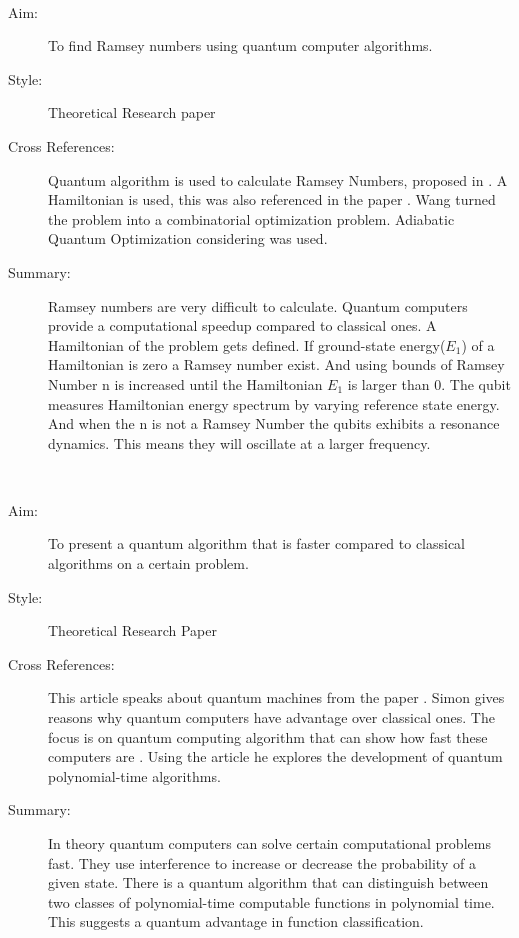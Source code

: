 \documentclass{Assignment}
\begin{document}
\newpage
\cite{PhysRevA.93.032301}~
\begin{description}
	\item [Aim:]
	To find Ramsey numbers using quantum computer algorithms.
	\item [Style:]
	Theoretical Research paper
	\item [Cross References:]
	Quantum algorithm is used to calculate Ramsey Numbers, proposed in \cite{gaitan2012ramsey}.
	A Hamiltonian is used, this was also referenced in the paper \cite{doi:10.1137/S0097539796298637}.
	Wang turned the problem into a combinatorial optimization problem.
	Adiabatic Quantum Optimization considering \cite{farhi2000quantum} was used.
	
	\item [Summary:]
	Ramsey numbers are very difficult to calculate.
	Quantum computers provide a computational speedup compared to classical ones.
	A Hamiltonian of the problem gets defined.
	If ground-state energy($E_1$) of a Hamiltonian is zero a Ramsey number exist. 
	And using bounds of Ramsey Number n is increased until the Hamiltonian $E_1$ is larger than 0.
	The qubit measures Hamiltonian energy spectrum by varying reference state energy. 
	And when the n is not a Ramsey Number the qubits exhibits a resonance dynamics.
	This means they will oscillate at a larger frequency.
\end{description}


\newpage


\cite{doi:10.1137/S0097539796298637}~
\begin{description}
	\item[Aim:]
	To present a quantum algorithm that is faster compared to classical algorithms on a certain problem.
	\item [Style:]
	Theoretical Research Paper
	\item [Cross References:]
	This article speaks about quantum machines from the paper \cite{Deutsch1989}.
	Simon gives reasons why quantum computers have advantage over classical ones.
	The focus is on quantum computing algorithm that can show how fast these computers are	.
	Using the article \cite{shor1994algorithms} he explores the development of quantum polynomial-time algorithms.
	\item[Summary:]
	 In theory quantum computers can solve certain computational problems fast.
	They use interference to increase or decrease the probability of a given state.
	There is a quantum algorithm that can distinguish between two classes of polynomial-time computable functions in polynomial time. 
	This suggests a quantum advantage in function classification. 
\end{description}
\end{document}
